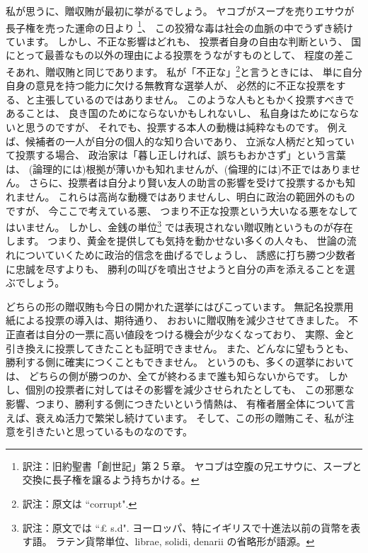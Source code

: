 \documentclass{article}
\begin{document}
私が思うに、贈収賄が最初に挙がるでしょう。
ヤコブがスープを売りエサウが長子権を売った運命の日より
\footnote{訳注：旧約聖書「創世記」第２５章。
ヤコブは空腹の兄エサウに、スープと交換に長子権を譲るよう持ちかける。}、
この狡猾な毒は社会の血脈の中でうずき続けています。
しかし、不正な影響はどれも、
投票者自身の自由な判断という、
国にとって最善なもの以外の理由による投票をうながすものとして、
程度の差こそあれ、贈収賄と同じであります。
私が「不正な」\footnote{訳注：原文は ``corrupt".}と言うときには、
単に自分自身の意見を持つ能力に欠ける無教育な選挙人が、
必然的に不正な投票をする、と主張しているのではありません。
このような人もともかく投票すべきであることは、
良き国のためにならないかもしれないし、
私自身はためにならないと思うのですが、
それでも、投票する本人の動機は純粋なものです。
例えば、候補者の一人が自分の個人的な知り合いであり、
立派な人柄だと知っていて投票する場合、
政治家は「暮し正しければ、誤ちもおかさず」という言葉は、
(論理的には)根拠が薄いかも知れませんが、(倫理的には)不正ではありません。
さらに、投票者は自分より賢い友人の助言の影響を受けて投票するかも知れません。
これらは高尚な動機ではありませんし、明白に政治の範囲外のものですが、
今ここで考えている悪、
つまり不正な投票という大いなる悪をなしてはいません。
しかし、金銭の単位\footnote{訳注：原文では ``£ s.d".
ヨーロッパ、特にイギリスで十進法以前の貨幣を表す語。
ラテン貨幣単位、librae, solidi, denarii の省略形が語源。}
では表現されない贈収賄というものが存在します。
つまり、黄金を提供しても気持を動かせない多くの人々も、
世論の流れについていくために政治的信念を曲げるでしょうし、
誘惑に打ち勝つ少数者に忠誠を尽すよりも、
勝利の叫びを噴出させようと自分の声を添えることを選ぶでしょう。

\medskip

どちらの形の贈収賄も今日の開かれた選挙にはびこっています。
無記名投票用紙による投票の導入は、期待通り、
おおいに贈収賄を減少させてきました。
不正直者は自分の一票に高い値段をつける機会が少なくなっており、
実際、金と引き換えに投票してきたことも証明できません。
また、どんなに望もうとも、勝利する側に確実につくこともできません。
というのも、多くの選挙においては、
どちらの側が勝つのか、全てが終わるまで誰も知らないからです。
しかし、個別の投票者に対してはその影響を減少させられたとしても、
この邪悪な影響、つまり、勝利する側につきたいという情熱は、
有権者層全体について言えば、衰えぬ活力で繁栄し続けています。
そして、この形の贈賄こそ、私が注意を引きたいと思っているものなのです。

\medskip
\end{document}

